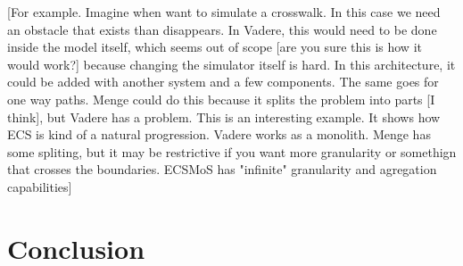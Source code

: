 \documentclass[twoside, 11pt]{article}
\begin{document}
[For example. Imagine when want to simulate a crosswalk. In this case we need an obstacle that exists than disappears. In Vadere, this would need to be done inside the model itself, which seems out of scope [are you sure this is how it would work?] because changing the simulator itself is hard. In this architecture, it could be added with another system and a few components. The same goes for one way paths. Menge could do this because it splits the problem into parts [I think], but Vadere has a problem. This is an interesting example. It shows how ECS is kind of a natural progression. Vadere works as a monolith. Menge has some spliting, but it may be restrictive if you want more granularity or somethign that crosses the boundaries. ECSMoS has "infinite" granularity and agregation capabilities]

\section{Conclusion}

\printbibliography
\end{document}

